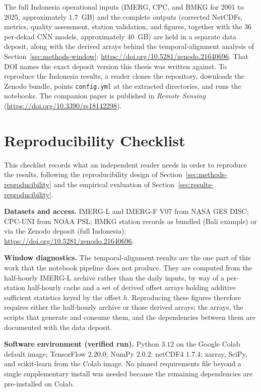 The full Indonesia operational inputs (IMERG, CPC, and BMKG for
2001 to 2025, approximately $1.7$~GB) and the complete outputs
(corrected NetCDFs, metrics, quality assessment, station
validation, and figures, together with the $36$ per-dekad CNN
models, approximately $40$~GB) are held in a separate data deposit,
along with the derived arrays behind the temporal-alignment
analysis of Section~\ref{sec:methods-window}:
\url{https://doi.org/10.5281/zenodo.21640696}. That DOI names the
exact deposit version this thesis was written against.
To reproduce the
Indonesia results, a reader clones the repository, downloads the
Zenodo bundle, points \texttt{config.yml} at the extracted
directories, and runs the notebooks. The companion paper is published in
\emph{Remote Sensing} \citep{ref:istanto2026mdpi}
(\url{https://doi.org/10.3390/rs18142298}).


\chapter{Reproducibility Checklist}\label{app:repro}

This checklist records what an independent reader needs in order
to reproduce the results, following the reproducibility design of
Section~\ref{sec:methods-reproducibility} and the empirical
evaluation of Section~\ref{sec:results-reproducibility}.

\medskip\noindent\textbf{Datasets and access.}
IMERG-L and IMERG-F V07 from NASA GES DISC; CPC-UNI from NOAA PSL;
BMKG station records as bundled (Bali example) or via the Zenodo
deposit (full Indonesia):
\url{https://doi.org/10.5281/zenodo.21640696}.

\medskip\noindent\textbf{Window diagnostics.}
The temporal-alignment results are the one part of this work that
the notebook pipeline does not produce. They are computed from the
half-hourly IMERG-L archive rather than the daily inputs, by way of
a per-station half-hourly cache and a set of derived offset arrays
holding additive sufficient statistics keyed by the offset $h$.
Reproducing these figures therefore requires either the half-hourly
archive or those derived arrays; the arrays, the scripts that
generate and consume them, and the dependencies between them are
documented with the data deposit.

\medskip\noindent\textbf{Software environment (verified run).}
Python $3.12$ on the Google Colab default image; TensorFlow
$2.20.0$; NumPy $2.0.2$; netCDF4 $1.7.4$; xarray, SciPy, and
scikit-learn from the Colab image. No pinned requirements file
beyond a single supplementary install was needed because the
remaining dependencies are pre-installed on Colab.

